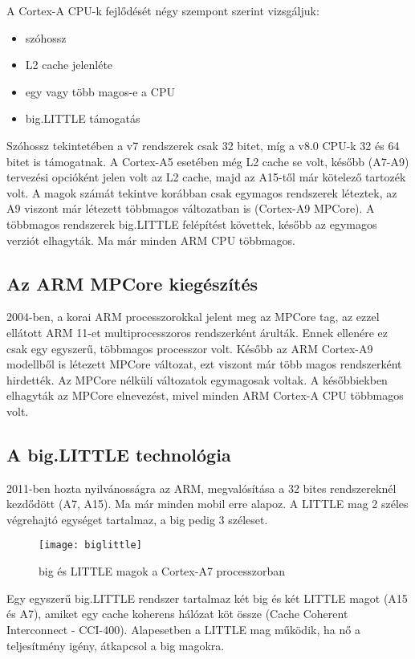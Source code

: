 A Cortex-A CPU-k fejlődését négy szempont szerint vizsgáljuk:
\begin{itemize}
    \item szóhossz
    \item L2 cache jelenléte
    \item egy vagy több magos-e a CPU
    \item big.LITTLE támogatás
\end{itemize}

Szóhossz tekintetében a v7 rendszerek csak 32 bitet, míg a v8.0 CPU-k 32 és 64 bitet is támogatnak.
A Cortex-A5 esetében még L2 cache se volt, később (A7-A9) tervezési opcióként jelen volt az L2 cache, majd az A15-től már kötelező tartozék volt.
A magok számát tekintve korábban csak egymagos rendszerek léteztek, az A9 viszont már létezett többmagos változatban is (Cortex-A9 MPCore).
A többmagos rendszerek big.LITTLE felépítést követtek, később az egymagos verziót elhagyták.
Ma már minden ARM CPU többmagos.

\subsection{Az ARM MPCore kiegészítés}
2004-ben, a korai ARM processzorokkal jelent meg az MPCore tag, az ezzel ellátott ARM 11-et multiprocesszoros rendszerként árulták.
Ennek ellenére ez csak egy egyszerű, többmagos processzor volt.
Később az ARM Cortex-A9 modellből is létezett MPCore változat, ezt viszont már több magos rendszerként hirdették.
Az MPCore nélküli változatok egymagosak voltak.
A későbbiekben elhagyták az MPCore elnevezést, mivel minden ARM Cortex-A CPU többmagos volt.

\subsection{A big.LITTLE technológia}
2011-ben hozta nyilvánosságra az ARM, megvalósítása a 32 bites rendszereknél kezdődött (A7, A15).
Ma már minden mobil erre alapoz.
A LITTLE mag 2 széles végrehajtó egységet tartalmaz, a big pedig 3 széleset.
\begin{figure}[H]
    \texttt{[image: biglittle]}
    \centering
    \caption{big és LITTLE magok a Cortex-A7 processzorban}
    \label{fig:biglittle}
\end{figure}
Egy egyszerű big.LITTLE rendszer tartalmaz két big és két LITTLE magot (A15 és A7), amiket egy cache koherens hálózat köt össze (Cache Coherent Interconnect - CCI-400).
Alapesetben a LITTLE mag működik, ha nő a teljesítmény igény, átkapcsol a big magokra.

